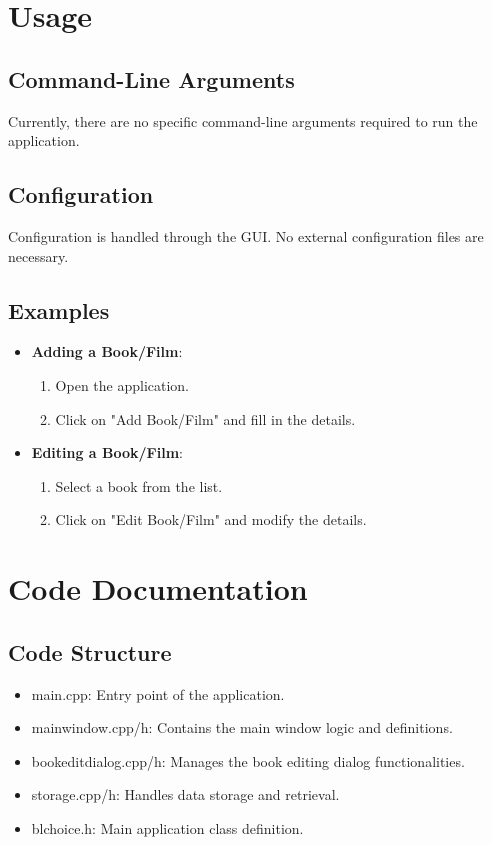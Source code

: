 \documentclass{article}
\begin{document}
\section{Usage}

\subsection{Command-Line Arguments}
Currently, there are no specific command-line arguments required to run the application.

\subsection{Configuration}
Configuration is handled through the GUI. No external configuration files are necessary.

\subsection{Examples}
\begin{itemize}
    \item \textbf{Adding a Book/Film}:
    \begin{enumerate}
        \item Open the application.
        \item Click on "Add Book/Film" and fill in the details.
    \end{enumerate}
    \item \textbf{Editing a Book/Film}:
    \begin{enumerate}
        \item Select a book from the list.
        \item Click on "Edit Book/Film" and modify the details.
    \end{enumerate}
\end{itemize}

\section{Code Documentation}

\subsection{Code Structure}
\begin{itemize}
    \item {main.cpp}: Entry point of the application.
    \item {mainwindow.cpp/h}: Contains the main window logic and definitions.
    \item {bookeditdialog.cpp/h}: Manages the book editing dialog functionalities.
    \item {storage.cpp/h}: Handles data storage and retrieval.
    \item {blchoice.h}: Main application class definition.
\end{itemize}
\end{document}
